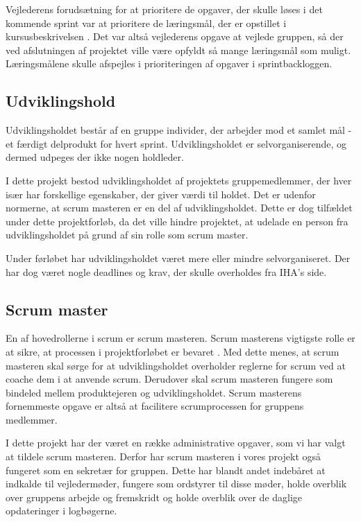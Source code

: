 \noindent Vejlederens forudsætning for at prioritere de opgaver, der skulle løses i det kommende sprint var at prioritere de læringsmål, der er opstillet i kursusbeskrivelsen \cite{laeringsmaal}. Det var altså vejlederens opgave at vejlede gruppen, så der ved afslutningen af projektet ville være opfyldt så mange læringsmål som muligt. Læringsmålene skulle afspejles i prioriteringen af opgaver i sprintbackloggen. 

\subsection{Udviklingshold}
Udviklingsholdet består af en gruppe individer, der arbejder mod et samlet mål - et færdigt delprodukt for hvert sprint. Udviklingsholdet er selvorganiserende, og dermed udpeges der ikke nogen holdleder. \cite{scrumGuides} \newline

\noindent I dette projekt bestod udviklingsholdet af projektets gruppemedlemmer, der hver især har forskellige egenskaber, der giver værdi til holdet. Det er udenfor normerne, at scrum masteren er en del af udviklingsholdet. Dette er dog tilfældet under dette projektforløb, da det ville hindre projektet, at udelade en person fra udviklingsholdet på grund af sin rolle som scrum master. \newline

\noindent Under førløbet har udviklingsholdet været mere eller mindre selvorganiseret. Der har dog været nogle deadlines og krav, der skulle overholdes fra IHA's side.

\subsection{Scrum master}
En af hovedrollerne i scrum er scrum masteren. Scrum masterens vigtigste rolle er at sikre, at processen i projektforløbet er bevaret \cite{scrumGuides}. Med dette menes, at scrum masteren skal sørge for at udviklingsholdet overholder reglerne for scrum ved at coache dem i at anvende scrum. Derudover skal scrum masteren fungere som bindeled mellem produktejeren og udviklingsholdet. Scrum masterens fornemmeste opgave er altså at facilitere scrumprocessen for gruppens medlemmer. \newline

\noindent I dette projekt har der været en række administrative opgaver, som vi har valgt at tildele scrum masteren. Derfor har scrum masteren i vores projekt også fungeret som en sekretær for gruppen. Dette har blandt andet indebåret at indkalde til vejledermøder, fungere som ordstyrer til disse møder, holde overblik over gruppens arbejde og fremskridt og holde overblik over de daglige opdateringer i logbøgerne. \newline

